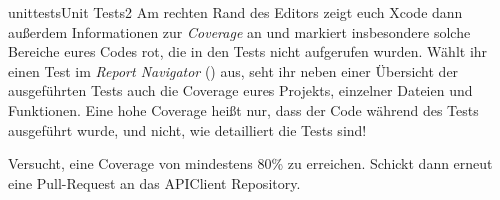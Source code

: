 \documentclass[parskip=half, final]{scrreprt}
\begin{document}
\begin{lecture}
\begin{exc}
\begin{excitem}{unittests}{Unit Tests}{2}
Am rechten Rand des Editors zeigt euch Xcode dann außerdem Informationen zur \emph{Coverage} an und markiert insbesondere solche Bereiche eures Codes rot, die in den Tests nicht aufgerufen wurden. Wählt ihr einen Test im \emph{Report Navigator} () aus, seht ihr neben einer Übersicht der ausgeführten Tests auch die Coverage eures Projekts, einzelner Dateien und Funktionen. Eine hohe Coverage heißt nur, dass der Code während des Tests ausgeführt wurde, und nicht, wie detailliert die Tests sind!

Versucht, eine Coverage von mindestens 80\% zu erreichen. Schickt dann erneut eine Pull-Request an das APIClient Repository.

\end{excitem}


\end{exc}


\end{lecture}
\end{document}
